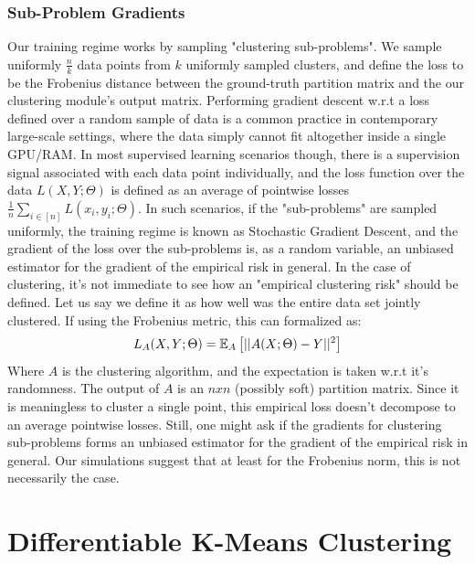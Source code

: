 \subsubsection{Sub-Problem Gradients}
Our training regime works by sampling "clustering sub-problems". We sample uniformly $\frac{n}{k}$ data points from $k$ uniformly sampled clusters, and define the loss to be the Frobenius distance between the ground-truth partition matrix and the our clustering module's output matrix. Performing gradient descent w.r.t a loss defined over a random sample of data is a common practice in contemporary large-scale settings, where the data simply cannot fit altogether inside a single GPU/RAM. 
In most supervised learning scenarios though, there is a supervision signal associated with each data point individually, and the loss function over the data $L(X,Y;\Theta)$ is defined as an average of pointwise losses $\frac{1}{n}\sum_{i\in [n]} L(x_i,y_i;\Theta)$. In such scenarios, if the "sub-problems" are sampled uniformly, the training regime is known as Stochastic Gradient Descent, and the gradient of the loss over the sub-problems is, as a random variable, an unbiased estimator for the gradient of the empirical risk in general.
In the case of clustering, it's not immediate to see how an "empirical clustering risk" should be defined. Let us say we define it as how well was the entire data set jointly clustered. If using the Frobenius metric, this can formalized as: 
\begin{equation}
L_A(X,Y;\Theta) = \mathbb{E}_{A}\left[{||A(X;\Theta) - Y ||^2}\right]
\end{equation}
Where $A$ is the clustering algorithm, and the expectation is taken w.r.t it's randomness. The output of $A$ is an $nxn$ (possibly soft) partition matrix.
Since it is meaningless to cluster a single point, this empirical loss doesn't decompose to an average pointwise losses. Still, one might ask if the gradients for clustering sub-problems forms an unbiased estimator for the gradient of the empirical risk in general. Our simulations suggest that at least for the Frobenius norm, this is not necessarily the case. 

\section{Differentiable K-Means Clustering}
\label{diff_clust}
